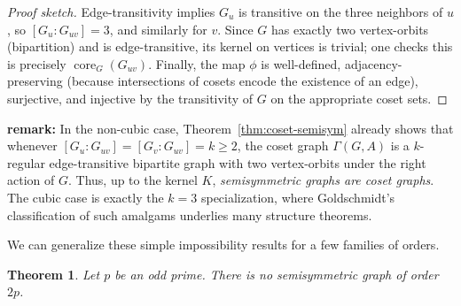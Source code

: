 \documentclass[12pt,a4paper,openany]{book}
\newtheorem{theorem}{Theorem}[section]
\begin{document}
\begin{proof}[Proof sketch]
Edge-transitivity implies $G_u$ is transitive on the three neighbors of $u$,
so $[G_u:G_{uv}]=3$, and similarly for $v$. Since $G$ has exactly two vertex-orbits
(bipartition) and is edge-transitive, its kernel on vertices is trivial; one checks
this is precisely $\operatorname{core}_G(G_{uv})$. Finally, the map $\phi$ is
well-defined, adjacency-preserving (because intersections of cosets encode the
existence of an edge), surjective, and injective by the transitivity of $G$ on
the appropriate coset sets.
\end{proof}

\noindent\textbf{remark:}
In the non-cubic case, Theorem~\ref{thm:coset-semisym} already shows that whenever
$[G_u:G_{uv}]=[G_v:G_{uv}]=k\ge2$, the coset graph $\Gamma(G,A)$ is a $k$-regular
edge-transitive bipartite graph with two vertex-orbits under the right action of $G$.
Thus, up to the kernel $K$, \emph{semisymmetric graphs are coset graphs}.
The cubic case is exactly the $k=3$ specialization, where Goldschmidt's
classification of such amalgams underlies many structure theorems.

We can generalize these simple impossibility results for a few families of orders.

\begin{theorem}\label{prop:2p_3p}
Let $p$ be an odd prime. There is no semisymmetric graph of order $2p$.

\end{theorem}
\end{document}
